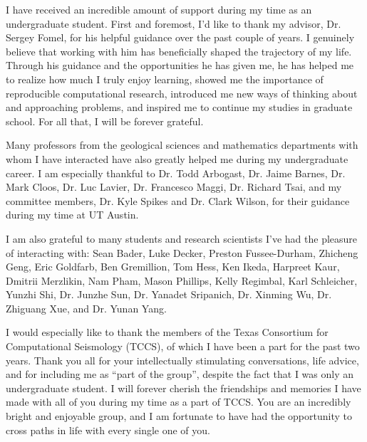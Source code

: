 I have received an incredible amount of support during my time as an undergraduate student. 
First and foremost, I'd like to thank my advisor, Dr. Sergey Fomel, for his helpful guidance over the past couple of years. 
I genuinely believe that working with him has beneficially shaped the trajectory of my life.
Through his guidance and the opportunities he has given me, he has helped me to realize how much I truly enjoy learning, showed me the importance of reproducible computational research, introduced me new ways of thinking about and approaching problems, and inspired me to continue my studies in graduate school.
For all that, I will be forever grateful.

Many professors from the geological sciences and mathematics departments with whom I have interacted have also greatly helped me during my undergraduate career.  
I am especially thankful to Dr. Todd Arbogast, Dr. Jaime Barnes, Dr. Mark Cloos, Dr. Luc Lavier, Dr. Francesco Maggi, Dr. Richard Tsai, and my committee members, Dr. Kyle Spikes and Dr. Clark Wilson, for their guidance during my time at UT Austin.

I am also grateful to many students and research scientists I've had the pleasure of interacting with: 
Sean Bader, Luke Decker, Preston Fussee-Durham, Zhicheng Geng, Eric Goldfarb, Ben Gremillion, Tom Hess, Ken Ikeda, Harpreet Kaur, Dmitrii Merzlikin, Nam Pham, Mason Phillips, Kelly Regimbal, Karl Schleicher, Yunzhi Shi, Dr. Junzhe Sun, Dr. Yanadet Sripanich, Dr. Xinming Wu, Dr. Zhiguang Xue, and Dr. Yunan Yang. 

I would especially like to thank the members of the Texas Consortium for Computational Seismology (TCCS), of which I have been a part for the past two years.
Thank you all for your intellectually stimulating conversations, life advice, and for including me as ``part of the group'', despite the fact that I was only an undergraduate student.
I will forever cherish the friendships and memories I have made with all of you during my time as a part of TCCS. %
You are an incredibly bright and enjoyable group, and I am fortunate to have had the opportunity to cross paths in life with every single one of you.

